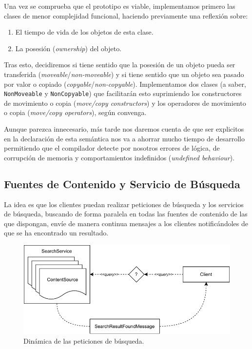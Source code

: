 \documentclass[a4paper]{article}
\begin{document}
	Una vez se comprueba que el prototipo es viable, implementamos primero las clases de menor complejidad funcional, haciendo previamente una reflexión sobre:
	\begin{enumerate}
		\item El tiempo de vida de los objetos de esta clase.
		\item La posesión (\textit{ownership}) del objeto.
	\end{enumerate}
	
	Tras esto, decidiremos si tiene sentido que la posesión de un objeto pueda ser transferida (\textit{moveable}/\textit{non-moveable}) y si tiene sentido que un objeto sea pasado por valor o copiado (\textit{copyable}/\textit{non-copyable}). Implementamos dos clases (a saber, \texttt{NonMoveable} y \texttt{NonCopyable}) que facilitarán esto suprimiendo los constructores de movimiento o copia (\textit{move/copy constructors}) y los operadores de movimiento o copia (\textit{move/copy operators}), según convenga.
	
	Aunque parezca innecesario, más tarde nos daremos cuenta de que ser explicitos en la declaración de esta semántica nos va a ahorrar mucho tiempo de desarrollo permitiendo que el compilador detecte por nosotros errores de lógica, de corrupción de memoria y comportamientos indefinidos (\textit{undefined behaviour}).
	
	\subsection{Fuentes de Contenido y Servicio de Búsqueda}
	La idea es que los clientes puedan realizar peticiones de búsqueda y los servicios de búsqueda, buscando de forma paralela en todas las fuentes de contenido de las que dispongan, envíe de manera continua mensajes a los clientes notificándoles de que se ha encontrado un resultado.
	
	\begin{figure}[h]
		\centering
		\includegraphics[scale=0.8]{figures/query_process.pdf}		
		\caption{Dinámica de las peticiones de búsqueda.}
	\end{figure}
	
\end{document}

